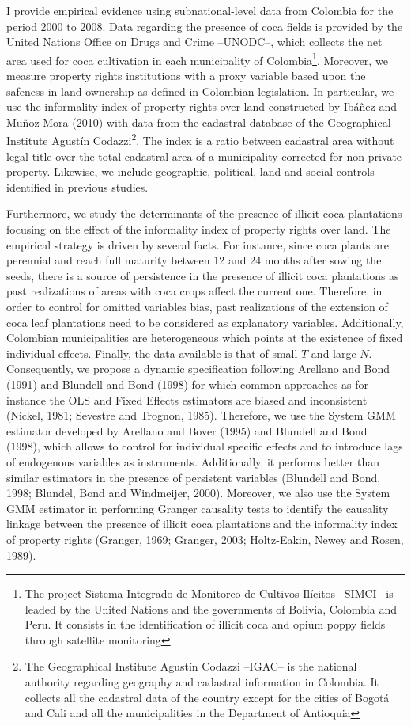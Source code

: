 I provide empirical evidence using subnational-level data from Colombia for the period 2000 to 2008. Data regarding the presence of coca fields is provided by the United Nations Office on Drugs and Crime --UNODC--, which collects the net area used for coca cultivation in each municipality of Colombia\footnote{The project Sistema Integrado de Monitoreo de Cultivos Il\'{i}citos --SIMCI-- is leaded by the United Nations and the governments of Bolivia, Colombia and Peru. It consists in the identification of illicit coca and opium poppy fields through satellite monitoring}. Moreover, we measure property rights institutions with a proxy variable based upon the safeness in land ownership as defined in Colombian legislation. In particular, we use the informality index of property rights over land constructed by Ib\'{a}\~{n}ez and Mu\~{n}oz-Mora (2010) with data from the cadastral database of the Geographical Institute Agust\'{i}n Codazzi\footnote{The Geographical Institute Agust\'{i}n Codazzi --IGAC-- is the national authority regarding geography and cadastral information in Colombia. It collects all the cadastral data of the country except for the cities of Bogot\'{a} and Cali and all the municipalities in the Department of Antioquia}. The index is a ratio between cadastral area without legal title over the total cadastral area of a municipality corrected for non-private property. Likewise, we include geographic, political, land and social controls identified in previous studies.

Furthermore, we study the determinants of the presence of illicit coca plantations focusing on the effect of the informality index of property rights over land. The empirical strategy is driven by several facts. For instance, since coca plants are perennial and reach full maturity between 12 and 24 months after sowing the seeds, there is a source of persistence in the presence of illicit coca plantations as past realizations of areas with coca crops affect the current one. Therefore, in order to control for omitted variables bias, past realizations of the extension of coca leaf plantations need to be considered as explanatory variables. Additionally, Colombian municipalities are heterogeneous which points at the existence of fixed individual effects. Finally, the data available is that of small $T$ and large $N$. Consequently, we propose a dynamic specification following Arellano and Bond (1991) and Blundell and Bond (1998) for which common approaches as for instance the OLS and Fixed Effects estimators are biased and inconsistent (Nickel, 1981; Sevestre and Trognon, 1985). Therefore, we use the System GMM estimator developed by Arellano and Bover (1995) and Blundell and Bond (1998), which allows to control for individual specific effects and to introduce lags of endogenous variables as instruments. Additionally, it performs better than similar estimators in the presence of persistent variables (Blundell and Bond, 1998; Blundel, Bond and Windmeijer, 2000). Moreover, we also use the System GMM estimator in performing Granger causality tests to identify the causality linkage between the presence of illicit coca plantations and the informality index of property rights (Granger, 1969; Granger, 2003; Holtz-Eakin, Newey and Rosen, 1989).

